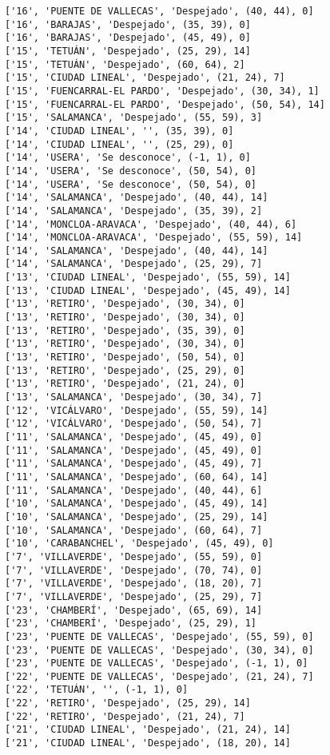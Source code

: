 \documentclass[11pt]{article}
\begin{document}
\begin{Verbatim}[commandchars=\\\{\}]
['16', 'PUENTE DE VALLECAS', 'Despejado', (40, 44), 0]
['16', 'BARAJAS', 'Despejado', (35, 39), 0]
['16', 'BARAJAS', 'Despejado', (45, 49), 0]
['15', 'TETUÁN', 'Despejado', (25, 29), 14]
['15', 'TETUÁN', 'Despejado', (60, 64), 2]
['15', 'CIUDAD LINEAL', 'Despejado', (21, 24), 7]
['15', 'FUENCARRAL-EL PARDO', 'Despejado', (30, 34), 1]
['15', 'FUENCARRAL-EL PARDO', 'Despejado', (50, 54), 14]
['15', 'SALAMANCA', 'Despejado', (55, 59), 3]
['14', 'CIUDAD LINEAL', '', (35, 39), 0]
['14', 'CIUDAD LINEAL', '', (25, 29), 0]
['14', 'USERA', 'Se desconoce', (-1, 1), 0]
['14', 'USERA', 'Se desconoce', (50, 54), 0]
['14', 'USERA', 'Se desconoce', (50, 54), 0]
['14', 'SALAMANCA', 'Despejado', (40, 44), 14]
['14', 'SALAMANCA', 'Despejado', (35, 39), 2]
['14', 'MONCLOA-ARAVACA', 'Despejado', (40, 44), 6]
['14', 'MONCLOA-ARAVACA', 'Despejado', (55, 59), 14]
['14', 'SALAMANCA', 'Despejado', (40, 44), 14]
['14', 'SALAMANCA', 'Despejado', (25, 29), 7]
['13', 'CIUDAD LINEAL', 'Despejado', (55, 59), 14]
['13', 'CIUDAD LINEAL', 'Despejado', (45, 49), 14]
['13', 'RETIRO', 'Despejado', (30, 34), 0]
['13', 'RETIRO', 'Despejado', (30, 34), 0]
['13', 'RETIRO', 'Despejado', (35, 39), 0]
['13', 'RETIRO', 'Despejado', (30, 34), 0]
['13', 'RETIRO', 'Despejado', (50, 54), 0]
['13', 'RETIRO', 'Despejado', (25, 29), 0]
['13', 'RETIRO', 'Despejado', (21, 24), 0]
['13', 'SALAMANCA', 'Despejado', (30, 34), 7]
['12', 'VICÁLVARO', 'Despejado', (55, 59), 14]
['12', 'VICÁLVARO', 'Despejado', (50, 54), 7]
['11', 'SALAMANCA', 'Despejado', (45, 49), 0]
['11', 'SALAMANCA', 'Despejado', (45, 49), 0]
['11', 'SALAMANCA', 'Despejado', (45, 49), 7]
['11', 'SALAMANCA', 'Despejado', (60, 64), 14]
['11', 'SALAMANCA', 'Despejado', (40, 44), 6]
['10', 'SALAMANCA', 'Despejado', (45, 49), 14]
['10', 'SALAMANCA', 'Despejado', (25, 29), 14]
['10', 'SALAMANCA', 'Despejado', (60, 64), 7]
['10', 'CARABANCHEL', 'Despejado', (45, 49), 0]
['7', 'VILLAVERDE', 'Despejado', (55, 59), 0]
['7', 'VILLAVERDE', 'Despejado', (70, 74), 0]
['7', 'VILLAVERDE', 'Despejado', (18, 20), 7]
['7', 'VILLAVERDE', 'Despejado', (25, 29), 7]
['23', 'CHAMBERÍ', 'Despejado', (65, 69), 14]
['23', 'CHAMBERÍ', 'Despejado', (25, 29), 1]
['23', 'PUENTE DE VALLECAS', 'Despejado', (55, 59), 0]
['23', 'PUENTE DE VALLECAS', 'Despejado', (30, 34), 0]
['23', 'PUENTE DE VALLECAS', 'Despejado', (-1, 1), 0]
['22', 'PUENTE DE VALLECAS', 'Despejado', (21, 24), 7]
['22', 'TETUÁN', '', (-1, 1), 0]
['22', 'RETIRO', 'Despejado', (25, 29), 14]
['22', 'RETIRO', 'Despejado', (21, 24), 7]
['21', 'CIUDAD LINEAL', 'Despejado', (21, 24), 14]
['21', 'CIUDAD LINEAL', 'Despejado', (18, 20), 14]

\end{Verbatim}
\end{document}
